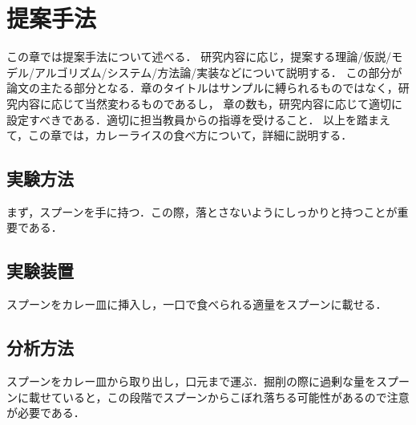 \chapter{提案手法}	%
\thispagestyle{plain}   %

この章では提案手法について述べる．
研究内容に応じ，提案する理論/仮説/モデル/アルゴリズム/システム/方法論/実装などについて説明する．
この部分が論文の主たる部分となる．章のタイトルはサンプルに縛られるものではなく，研究内容に応じて当然変わるものであるし，
章の数も，研究内容に応じて適切に設定すべきである．適切に担当教員からの指導を受けること．
以上を踏まえて，この章では，カレーライスの食べ方について，詳細に説明する．

\section{実験方法}
まず，スプーンを手に持つ．この際，落とさないようにしっかりと持つことが重要である．

\section{実験装置}
スプーンをカレー皿に挿入し，一口で食べられる適量をスプーンに載せる．

\section{分析方法}
スプーンをカレー皿から取り出し，口元まで運ぶ．掘削の際に過剰な量をスプーンに載せていると，この段階でスプーンからこぼれ落ちる可能性があるので注意が必要である．

